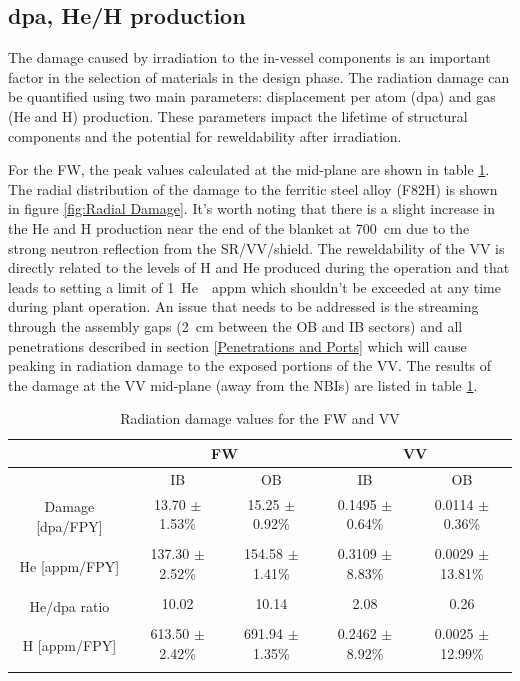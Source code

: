 \documentclass[12pt, letterpaper]{elsarticle}
\begin{document}
\subsection{dpa, He/H production} \label{dpa, He/H production}
The damage caused by irradiation to the in-vessel components is an important factor in the selection of materials in the design phase. The radiation damage can be quantified using two main parameters: displacement per atom (dpa) and gas (He and H) production. These parameters impact the lifetime of structural components and the potential for reweldability after irradiation.\vspace{5mm}

For the FW, the peak values calculated at the mid-plane are shown in table \ref{Radiation damage values for the FW and VV}. The radial distribution of the damage to the ferritic steel alloy (F82H) is shown in figure \ref{fig:Radial Damage}. It's worth noting that there is a slight increase in the He and H production near the end of the blanket at \SI{700}{cm} due to the strong neutron reflection from the SR/VV/shield. The reweldability of the VV is directly related to the levels of H and He produced during the operation and that leads to setting a limit of \SI{1}{He\hspace{1 mm} appm} which shouldn't be exceeded at any time during plant operation. An issue that needs to be addressed is the streaming through the assembly gaps (\SI{2}{cm} between the OB and IB sectors) and all penetrations described in section \ref{Penetrations and Ports} which will cause peaking in radiation damage to the exposed portions of the VV. The results of the damage at the VV mid-plane (away from the NBIs) are listed in table \ref{Radiation damage values for the FW and VV}.   
\begin{table}[h!]
	\caption{Radiation damage values for the FW and VV}
	\label{Radiation damage values for the FW and VV}
	\begin{tabular}{ |c|c|c|c|c| } 
		\hline
		{} & \multicolumn{2}{|c|}{FW} & \multicolumn{2}{|c|}{VV} \\
		\hline
		{} & IB & OB & IB & OB \\
		\hline
		\multirow{2}{6em}{Damage [dpa/FPY]} & 13.70 $\pm$ 1.53\% & 15.25 $\pm$ 0.92\% & 0.1495 $\pm$ 0.64\% & 0.0114 $\pm$ 0.36\%  \\
		& {} & {} & {} & {} \\
		\hline
		\multirow{2}{6em}{He [appm/FPY]} & 137.30 $\pm$ 2.52\% & 154.58 $\pm$ 1.41\% & 0.3109 $\pm$ 8.83\% & 0.0029 $\pm$ 13.81\%  \\
		& {} & {} & {} & {} \\
		\hline
		\multirow{2}{6em}{He/dpa ratio} & 10.02 & 10.14 & 2.08 & 0.26  \\
		& {} & {} & {} & {} \\
		\hline
		\multirow{2}{6em}{H [appm/FPY]} & 613.50 $\pm$ 2.42\% & 691.94 $\pm$ 1.35\% & 0.2462 $\pm$ 8.92\% & 0.0025 $\pm$ 12.99\%  \\
		& {} & {} & {} & {} \\
		\hline
	\end{tabular}
\end{table}
\end{document}
